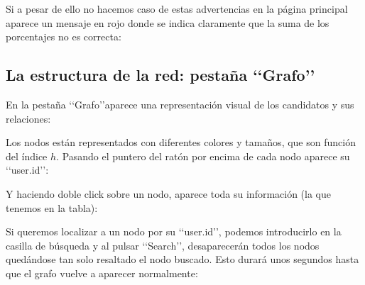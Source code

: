 
Si a pesar de ello no hacemos caso de estas advertencias en la 
página principal aparece un mensaje en rojo donde se indica claramente que la suma 
de los porcentajes no es correcta: 

 


\subsection{La estructura de la red: pestaña \lq\lq Grafo\rq\rq}

En la pestaña \lq\lq Grafo\rq\rq aparece una representación visual de los candidatos 
y sus relaciones:


Los nodos están representados con diferentes colores y tamaños, que son función del 
índice $h$. Pasando el puntero del ratón por encima de cada nodo aparece su 
\lq\lq user.id\rq\rq:


Y haciendo doble click sobre un nodo, aparece toda su información (la que 
tenemos en la tabla):


Si queremos localizar a un nodo por su \lq\lq user.id\rq\rq, podemos introducirlo en la
casilla de búsqueda y al pulsar \lq\lq Search\rq\rq, desaparecerán todos los nodos 
quedándose tan solo resaltado el nodo buscado. 
Esto durará unos segundos hasta que el grafo vuelve a aparecer normalmente:

